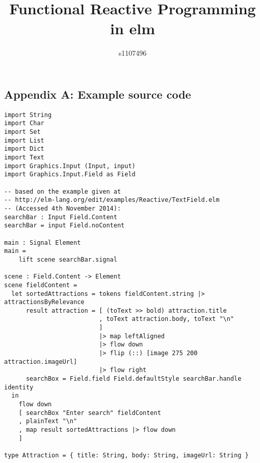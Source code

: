 \documentclass[12pt]{article}
\begin{document}
\title{Functional Reactive Programming in elm}
\author{s1107496}

\maketitle



\begin{appendices}
\chapter{Appendix A: Example source code}
\begin{verbatim}
import String
import Char
import Set
import List
import Dict
import Text
import Graphics.Input (Input, input)
import Graphics.Input.Field as Field

-- based on the example given at 
-- http://elm-lang.org/edit/examples/Reactive/TextField.elm 
-- (Accessed 4th November 2014):
searchBar : Input Field.Content
searchBar = input Field.noContent

main : Signal Element
main =
    lift scene searchBar.signal

scene : Field.Content -> Element
scene fieldContent = 
  let sortedAttractions = tokens fieldContent.string |> attractionsByRelevance
      result attraction = [ (toText >> bold) attraction.title
                          , toText attraction.body, toText "\n"
                          ] 
                          |> map leftAligned 
                          |> flow down
                          |> flip (::) [image 275 200 attraction.imageUrl]
                          |> flow right
      searchBox = Field.field Field.defaultStyle searchBar.handle identity
  in 
    flow down
    [ searchBox "Enter search" fieldContent
    , plainText "\n"
    , map result sortedAttractions |> flow down
    ]

type Attraction = { title: String, body: String, imageUrl: String }


\end{verbatim}
\end{appendices}
\end{document}

